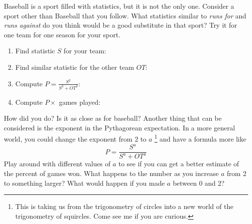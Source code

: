Baseball is a sport filled with statistics, but it is not the only one. Consider a sport other than Baseball that you follow. What statistics similar to \emph{runs for} and \emph{runs against} do you think would be  a good substitute in that sport? Try it for one team for one season for your sport.
\begin{enumerate}
	\item Find statistic \(S\) for your team: \underline{\hspace{2cm}}
	\item Find similar statistic for the other team \(OT\): \underline{\hspace{2cm}}
	\item Compute \( P = \frac{S^2}{S^2+OT^2}\): \underline{\hspace{2cm}}
	\item Compute \(P\times\) games played: \underline{\hspace{2cm}}
\end{enumerate}
How did you do? Is it as close as for baseball?
\vfill
Another thing that can be considered is the exponent in the Pythagorean expectation. In a more general world, you could change the exponent from 2 to \(a\) \footnote{This is taking us from the trigonometry of circles into a new world of the trigonometry of squircles. Come see me if you are curious.} and have a formula more like
\[ P = \frac{S^a}{S^a+OT^a}\]
Play around with different values of \(a\) to see if you can get a better estimate of the percent of games won.  What happens to the number as you increase \(a\) from 2 to something larger?  What would happen if you made \(a\) between 0 and 2?\vfill
